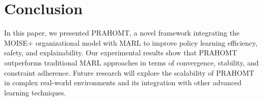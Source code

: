 \documentclass{article}
\begin{document}
\section{Conclusion}
\label{sec:conclusion}
In this paper, we presented PRAHOMT, a novel framework integrating the MOISE+ organizational model with MARL to improve policy learning efficiency, safety, and explainability. Our experimental results show that PRAHOMT outperforms traditional MARL approaches in terms of convergence, stability, and constraint adherence. Future research will explore the scalability of PRAHOMT in complex real-world environments and its integration with other advanced learning techniques.



\end{document}
